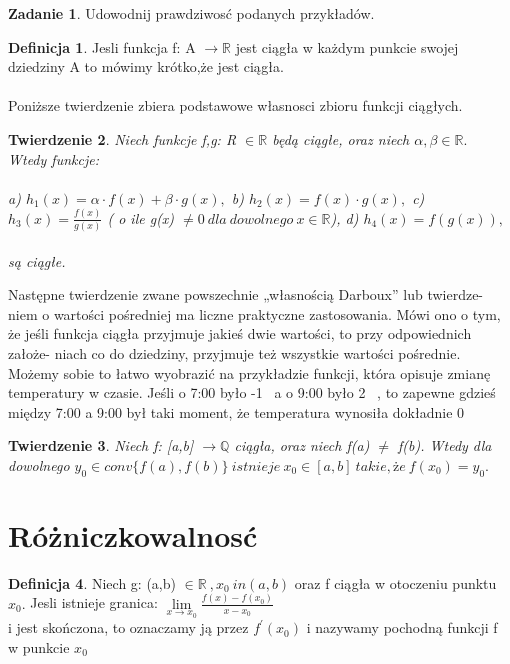 \documentclass[12pt,a4paper]{article}
\newtheorem{tw}{Twierdzenie}[section]
\theoremstyle{definition}
\newtheorem{df}[tw]{Definicja}
\newtheorem{zad}{Zadanie}
\begin{document}
\begin{zad}
Udowodnij prawdziwosć podanych przykładów.
\end{zad}

\begin{df}
Jesli funkcja f: A $ \to \mathbb{R} $ jest ciągła w każdym punkcie swojej dziedziny A to mówimy krótko,że jest ciągła. \\ \\
Poniższe twierdzenie zbiera podstawowe własnosci zbioru funkcji ciągłych.
\end{df}

\begin{tw}
Niech funkcje f,g: R $\in \mathbb{R}$ będą ciągłe, oraz niech $ \alpha,\beta \in \mathbb{R}.$ \\
Wtedy funkcje: \\ \\
a) $h_{1}(x) = \alpha \cdot f(x) + \beta \cdot g(x),$
b) $h_{2}(x) = f(x) \cdot g(x),$
c) $h_{3}(x) = \frac {f(x)} {g(x)} $ ( o ile g(x) $ \neq 0 \ dla \ dowolnego \ x \in \mathbb{R} $),
d) $h_{4}(x) = f(g(x)),$ \\ \\
są ciągłe.
\end{tw}
Następne twierdzenie zwane powszechnie „własnością Darboux” lub twierdze-
niem o wartości pośredniej ma liczne praktyczne zastosowania. Mówi ono o tym,
że jeśli funkcja ciągła przyjmuje jakieś dwie wartości, to przy odpowiednich założe-
niach co do dziedziny, przyjmuje też wszystkie wartości pośrednie. Możemy sobie to
łatwo wyobrazić na przykładzie funkcji, która opisuje zmianę temperatury w czasie.
Jeśli o 7:00 było  -1 \textcelsius \
 a o 9:00 było 2 \textcelsius \
, to zapewne gdzieś między 7:00 a 9:00 był
taki moment, że temperatura wynosiła dokładnie 0 \textcelsius



\begin{tw}
Niech f: [a,b] $ \to \mathbb{Q} $ ciągła, oraz niech f(a) $\neq$ f(b). Wtedy dla dowolnego $ y_{0} \in conv \lbrace f(a), f(b) \rbrace \ istnieje \ x_{0} \in [a,b]\ takie, że \ f(x_{0}) = y_{0}. $
\end{tw}

\section{Różniczkowalnosć}
\begin{df}
Niech g: (a,b) $ \in \mathbb{R} \ , x_{0} \ in (a,b) $ oraz f ciągła w otoczeniu punktu $ x_{0}. $ Jesli istnieje granica: 
\center
$ {\mathop{\lim}\limits_{x \to x_{0}}  \frac {f(x) - f(x_{0})} {x-x_{0}}} $ \\
i jest skończona, to oznaczamy ją przez $ f^{\prime}(x_{0}) $ i nazywamy pochodną funkcji f w punkcie $ x_{0} $
\end{df}
\end{document}
